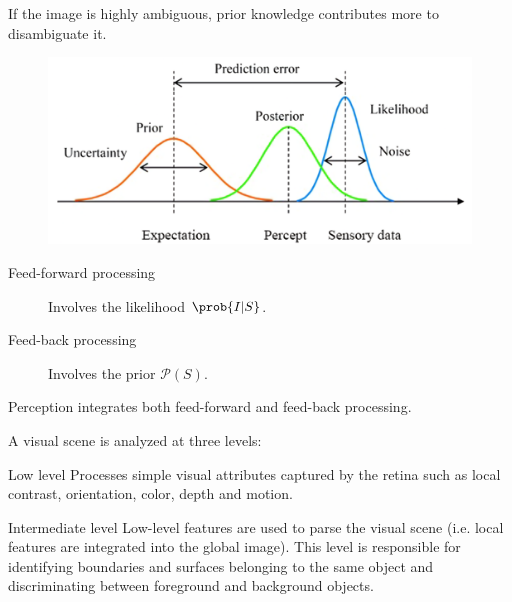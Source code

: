 \begin{description}
        \begin{remark}
            If the image is highly ambiguous, prior knowledge contributes more to disambiguate it.
        \end{remark}

        \begin{figure}[H]
            \centering
            \includegraphics[width=0.4\linewidth]{./img/vision_bayesian.png}
        \end{figure}

        \begin{description}
            \item[Feed-forward processing] Involves the likelihood $\prob{I | S}$.
            \item[Feed-back processing] Involves the prior $\mathcal{P}(S)$.
        \end{description}

        \begin{remark}
            Perception integrates both feed-forward and feed-back processing.
        \end{remark}


    \item[Vision levels] 
        A visual scene is analyzed at three levels:
        \begin{descriptionlist}
            \item[Low level]
                Processes simple visual attributes captured by the retina such as local contrast, orientation, color, depth and motion.

            \item[Intermediate level] 
                Low-level features are used to parse the visual scene (i.e. local features are integrated into the global image).
                This level is responsible for identifying boundaries and surfaces belonging to the same object and 
                discriminating between foreground and background objects.


\end{descriptionlist}
\end{description}
